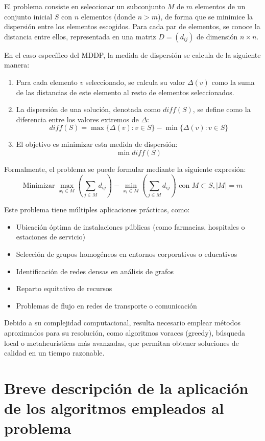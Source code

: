\documentclass{article}
\begin{document}
El problema consiste en seleccionar un subconjunto \(M\) de \(m\) elementos de un conjunto inicial \(S\) con \(n\) elementos (donde \(n > m\)), de forma que se minimice la dispersión entre los elementos escogidos. Para cada par de elementos, se conoce la distancia entre ellos, representada en una matriz \(D = (d_{ij})\) de dimensión \(n \times n\).

En el caso específico del MDDP, la medida de dispersión se calcula de la siguiente manera:
\begin{enumerate}
    \item Para cada elemento \(v\) seleccionado, se calcula su valor \(\Delta(v)\) como la suma de las distancias de este elemento al resto de elementos seleccionados.
    \item La dispersión de una solución, denotada como \(diff(S)\), se define como la diferencia entre los valores extremos de \(\Delta\):
    \[diff(S) = \max\{\Delta(v) : v \in S\} - \min\{\Delta(v) : v \in S\}\]
    \item El objetivo es minimizar esta medida de dispersión:
    \[\min diff(S)\]
\end{enumerate}

Formalmente, el problema se puede formular mediante la siguiente expresión:
\[\text{Minimizar } \max_{x_i \in M} \left( \sum_{j \in M} d_{ij} \right) - \min_{x_i \in M} \left( \sum_{j \in M} d_{ij} \right) \text{ con } M \subset S, |M| = m\]

Este problema tiene múltiples aplicaciones prácticas, como:
\begin{itemize}
    \item Ubicación óptima de instalaciones públicas (como farmacias, hospitales o estaciones de servicio)
    \item Selección de grupos homogéneos en entornos corporativos o educativos
    \item Identificación de redes densas en análisis de grafos
    \item Reparto equitativo de recursos
    \item Problemas de flujo en redes de transporte o comunicación
\end{itemize}

Debido a su complejidad computacional, resulta necesario emplear métodos aproximados para su resolución, como algoritmos voraces (greedy), búsqueda local o metaheurísticas más avanzadas, que permitan obtener soluciones de calidad en un tiempo razonable.

\section{Breve descripción de la aplicación de los algoritmos empleados al problema}
\end{document}
